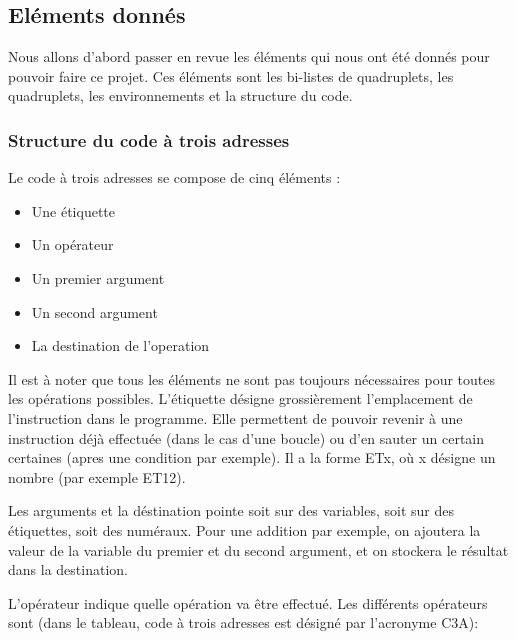 \documentclass{article}
\begin{document}
\subsection{Eléments donnés}
Nous allons d'abord passer en revue les éléments qui nous ont été donnés pour pouvoir faire ce projet. Ces éléments sont les bi-listes de quadruplets, les quadruplets, les environnements et la structure du code.
\subsubsection{Structure du code à trois adresses}

Le code à trois adresses se compose de cinq éléments :
\begin{itemize}
\item Une étiquette
\item Un opérateur
\item Un premier argument
\item Un second argument
\item La destination de l'operation
\end{itemize}

Il est à noter que tous les éléments ne sont pas toujours nécessaires pour toutes les opérations possibles.
\medbreak
L'étiquette désigne grossièrement l'emplacement de l'instruction dans le programme. Elle permettent de pouvoir revenir à une instruction déjà effectuée (dans le cas d'une boucle) ou d'en sauter un certain certaines (apres une condition par exemple). Il a la forme ETx, où x désigne un nombre (par exemple ET12).

Les arguments et la déstination pointe soit sur des variables, soit sur des étiquettes, soit des numéraux. Pour une addition par exemple, on ajoutera la valeur de la variable du premier et du second argument, et on stockera le résultat dans la destination.

L'opérateur indique quelle opération va être effectué. Les différents opérateurs sont (dans le tableau, code à trois adresses est désigné par l'acronyme C3A):
\end{document}
